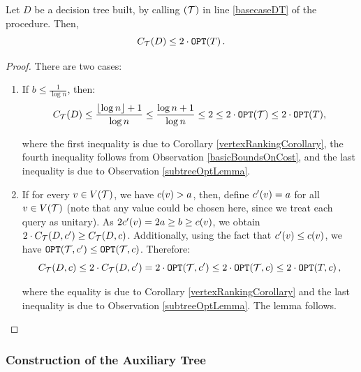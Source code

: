 \begin{lemma}\label{baseOfRecursion}
    Let $D$ be a decision tree built, by calling \FRankingBasedDT$\mathopen{}\left( \mathcal{T} \right)$ in line \ref{basecaseDT} of the \FCreateDecisionTree procedure. Then,  
$$
C_{\mathcal{T}}\mathopen{}\left( D \right)\leq 2\cdot\texttt{OPT}\mathopen{}\left( T \right).
$$
\begin{proof}
    There are two cases:
    \begin{enumerate}
        \item If $b\leq \frac{1}{\log n}$, then:
$$
C_{\mathcal{T}}\mathopen{}\left( D \right)\leq\frac{\mathopen{}\left\lfloor \log n \right\rfloor+1}{\log n}\leq \frac{\log n+1}{\log n}\leq2\leq 2\cdot \texttt{OPT}(\mathcal{T})\leq 2\cdot\texttt{OPT}(T),
$$

where the first inequality is due to Corollary \ref{vertexRankingCorollary}, the fourth inequality follows from Observation \ref{basicBoundsOnCost}, and the last inequality is due to Observation \ref{subtreeOptLemma}.

        \item If for every $v\in V\mathopen{}\left( \mathcal{T} \right)$, we have $c\mathopen{}\left( v \right)> a$, then, define $c'\mathopen{}\left( v \right)=a$ for all $v\in V\mathopen{}\left( \mathcal{T} \right)$ (note that any value could be chosen here, since we treat each query as unitary). As $2c'\mathopen{}\left( v \right) = 2a\geq b \geq c\mathopen{}\left( v \right)$, we obtain $2\cdot C_{\mathcal{T}}\mathopen{}\left( D, c' \right)\geq C_{\mathcal{T}}\mathopen{}\left( D, c \right)$. Additionally, using the fact that $c'\mathopen{}\left( v \right) \leq c\mathopen{}\left( v \right)$, we have $\texttt{OPT}\mathopen{}\left( \mathcal{T}, c' \right)\leq \texttt{OPT}\mathopen{}\left( \mathcal{T}, c \right)$. Therefore:
$$
C_{\mathcal{T}}\mathopen{}\left( D, c \right)\leq 2\cdot C_{\mathcal{T}}\mathopen{}\left( D, c' \right)=2\cdot \texttt{OPT}\mathopen{}\left( \mathcal{T}, c' \right)\leq 2\cdot\texttt{OPT}\mathopen{}\left( \mathcal{T}, c \right)\leq 2\cdot\texttt{OPT}\mathopen{}\left( T, c \right),
$$

where the equality is due to Corollary \ref{vertexRankingCorollary} and the last inequality is due to Observation \ref{subtreeOptLemma}. The lemma follows.
    \end{enumerate}
\end{proof}
\end{lemma}



\subsubsection{Construction of the Auxiliary Tree}\label{auxTreeConstruction}

